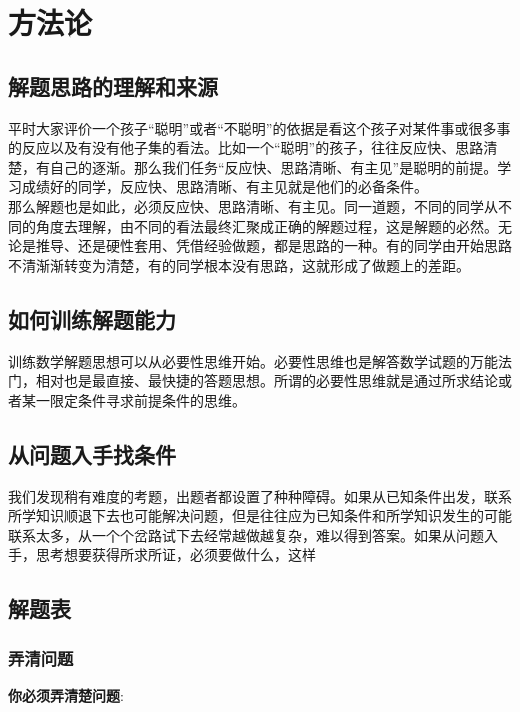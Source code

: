 \chapter{方法论}
\label{ch:方法论}

\section{解题思路的理解和来源}
平时大家评价一个孩子“聪明”或者“不聪明”的依据是看这个孩子对某件事或很多事的反应以及有没有他子集的看法。比如一个“聪明”的孩子，往往反应快、思路清楚，有自己的逐渐。那么我们任务“反应快、思路清晰、有主见”是聪明的前提。学习成绩好的同学，反应快、思路清晰、有主见就是他们的必备条件。\\
那么解题也是如此，必须反应快、思路清晰、有主见。同一道题，不同的同学从不同的角度去理解，由不同的看法最终汇聚成正确的解题过程，这是解题的必然。无论是推导、还是硬性套用、凭借经验做题，都是思路的一种。有的同学由开始思路不清渐渐转变为清楚，有的同学根本没有思路，这就形成了做题上的差距。\\
\section{如何训练解题能力}
训练数学解题思想可以从必要性思维开始。必要性思维也是解答数学试题的万能法门，相对也是最直接、最快捷的答题思想。所谓的必要性思维就是通过所求结论或者某一限定条件寻求前提条件的思维。
\section{从问题入手找条件}
我们发现稍有难度的考题，出题者都设置了种种障碍。如果从已知条件出发，联系所学知识顺退下去也可能解决问题，但是往往应为已知条件和所学知识发生的可能联系太多，从一个个岔路试下去经常越做越复杂，难以得到答案。如果从问题入手，思考想要获得所求所证，必须要做什么，这样

\section{解题表}

              
              
              

\subsection{弄清问题}
\textbf{你必须弄清楚问题}:

